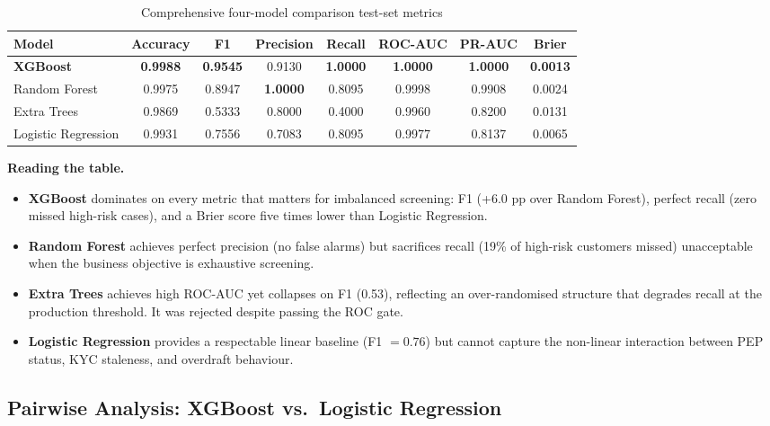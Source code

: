 \begin{table}[H]
\centering
\caption{Comprehensive four-model comparison test-set metrics}
\label{tab:all-models-comparison}
\renewcommand{\arraystretch}{1.25}
\begin{tabular}{|l|c|c|c|c|c|c|c|}
\hline
\textbf{Model} & \textbf{Accuracy} & \textbf{F1} & \textbf{Precision} & \textbf{Recall} & \textbf{ROC-AUC} & \textbf{PR-AUC} & \textbf{Brier} \\
\hline
\textbf{XGBoost} & \textbf{0.9988} & \textbf{0.9545} & 0.9130 & \textbf{1.0000} & \textbf{1.0000} & \textbf{1.0000} & \textbf{0.0013} \\
Random Forest & 0.9975 & 0.8947 & \textbf{1.0000} & 0.8095 & 0.9998 & 0.9908 & 0.0024 \\
Extra Trees & 0.9869 & 0.5333 & 0.8000 & 0.4000 & 0.9960 & 0.8200 & 0.0131 \\
Logistic Regression & 0.9931 & 0.7556 & 0.7083 & 0.8095 & 0.9977 & 0.8137 & 0.0065 \\
\hline
\end{tabular}
\end{table}

\textbf{Reading the table.}
\begin{itemize}
    \item \textbf{XGBoost} dominates on every metric that matters for imbalanced
          screening: F1 (+6.0 pp over Random Forest), perfect recall (zero missed
          high-risk cases), and a Brier score five times lower than Logistic Regression.
    \item \textbf{Random Forest} achieves perfect precision (no false alarms) but
          sacrifices recall (19\% of high-risk customers missed) unacceptable
          when the business objective is exhaustive screening.
    \item \textbf{Extra Trees} achieves high ROC-AUC yet collapses on F1 (0.53),
          reflecting an over-randomised structure that degrades recall at the
          production threshold. It was rejected despite passing the ROC gate.
    \item \textbf{Logistic Regression} provides a respectable linear baseline
          (F1 $= 0.76$) but cannot capture the non-linear interaction between
          PEP status, KYC staleness, and overdraft behaviour.
\end{itemize}

\subsection{Pairwise Analysis: XGBoost vs.\ Logistic Regression}

